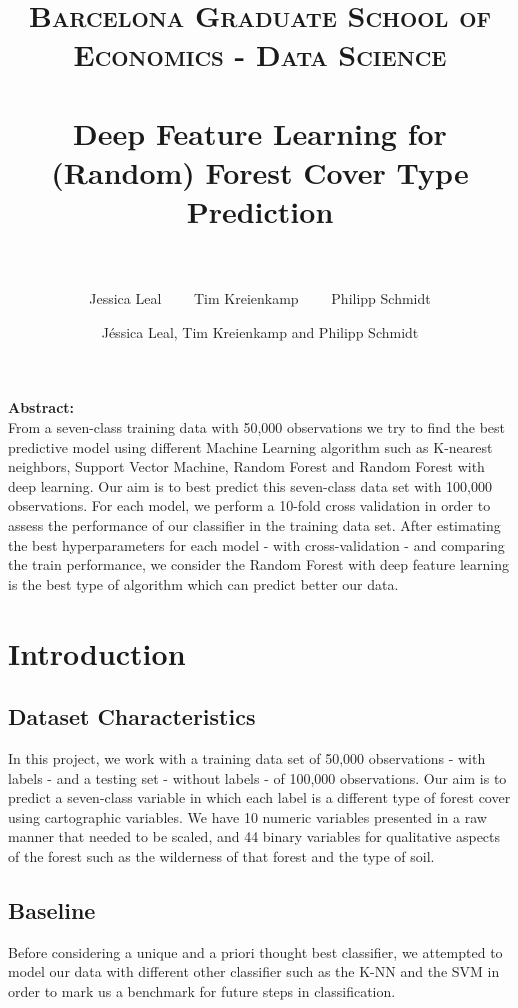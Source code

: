 \documentclass[paper=a4, fontsize=11pt]{scrartcl}
\title{	
\normalfont \normalsize 
\textsc{Barcelona Graduate School of Economics - Data Science} \\ [25pt]
\horrule{2pt} \\[0.5cm] 
\huge Deep Feature Learning for (Random) Forest Cover Type Prediction  \\ 
\horrule{2pt} \\[0.5cm] 
}
\author{Jessica Leal \  \ \ \ Tim Kreienkamp \  \  \  \ Philipp Schmidt}
\author{J\'essica Leal, Tim Kreienkamp and Philipp Schmidt}
\date{}
\numberwithin{equation}{section}
\numberwithin{figure}{section}
\numberwithin{table}{section}
\begin{document}


\maketitle
\textbf{Abstract:} \\
From a seven-class training data with 50,000 observations we try to find the best predictive model using different Machine Learning algorithm such as K-nearest neighbors, Support Vector Machine, Random Forest and Random Forest with deep learning. Our aim is to best predict this seven-class data set with 100,000 observations. For each model, we perform a 10-fold cross validation in order to assess the performance of our classifier in the training data set. After estimating the best hyperparameters for each model - with cross-validation - and comparing the train performance, we consider the Random Forest with deep feature learning is the best type of algorithm which can predict better our data. 





\section{Introduction}
\subsection{Dataset Characteristics}
In this project, we work with a training data set of 50,000 observations - with labels - and a testing set - without labels - of 100,000 observations. Our aim is to predict a seven-class variable in which each label is a different type of forest cover using cartographic variables. We have 10 numeric variables presented in a raw manner that needed to be scaled, and 44 binary variables for qualitative aspects of the forest such as the wilderness of that forest and the type of soil. 

\newpage



\subsection{Baseline}
Before considering a unique and a priori thought best classifier, we attempted to model our data with different other classifier such as the K-NN and the SVM in order to mark us a benchmark for future steps in classification.
\end{document}
